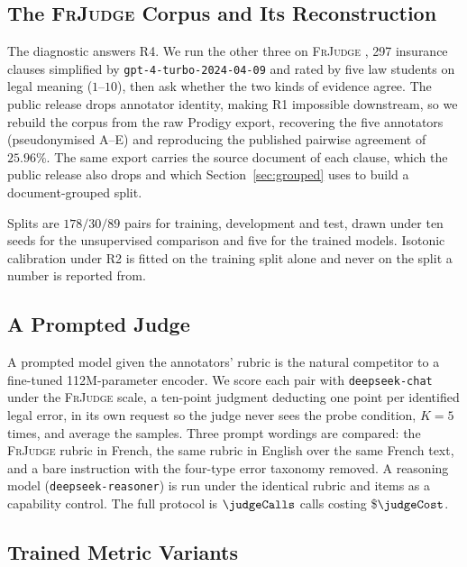 \documentclass{BVP_JCLLT}
\begin{document}
\subsection{The \textsc{FrJudge} Corpus and Its Reconstruction}\label{sec:corpus}

The diagnostic answers R4. We run the other three on \textsc{FrJudge}
\cite{beauchemin2025judgebert}, 297 insurance clauses simplified by
\texttt{gpt-4-turbo-2024-04-09} and rated by five law students on legal meaning
($1$--$10$), then ask whether the two kinds of evidence agree. The public
release drops annotator identity, making R1 impossible downstream, so we rebuild
the corpus from the raw Prodigy export, recovering the five annotators
(pseudonymised A--E) and reproducing the published pairwise agreement of
$25.96\%$. The same export carries the source document of each clause, which the
public release also drops and which Section~\ref{sec:grouped} uses to build a
document-grouped split.

Splits are $178/30/89$ pairs for training, development and test, drawn under ten
seeds for the unsupervised comparison and five for the trained models. Isotonic
calibration under R2 is fitted on the training split alone and never on the
split a number is reported from.

\subsection{A Prompted Judge}\label{sec:judgemethod}

A prompted model given the annotators' rubric \cite{enguehard2025lemaj} is the
natural competitor to a fine-tuned 112M-parameter encoder. We score each pair
with \texttt{deepseek-chat} under the \textsc{FrJudge} scale, a ten-point
judgment deducting one point per identified legal error, in its own request so
the judge never sees the probe condition, $K=5$ times, and average the samples.
Three prompt wordings are compared: the \textsc{FrJudge} rubric in French, the
same rubric in English over the same French text, and a bare instruction with
the four-type error taxonomy removed. A reasoning model
(\texttt{deepseek-reasoner}) is run under the identical rubric and items as a
capability control. The full protocol is $\judgeCalls$ calls costing
\$$\judgeCost$.

\subsection{Trained Metric Variants}\label{sec:variants}
\end{document}
